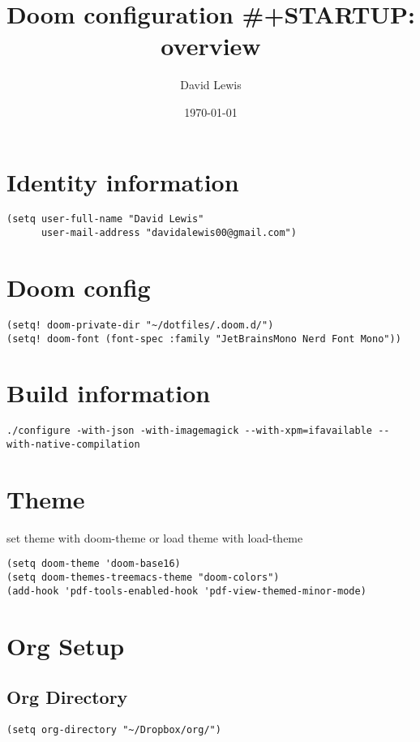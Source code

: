 \documentclass{assignments}
\author{David Lewis}
\date{\today}
\title{Doom configuration \#+STARTUP: overview}
\begin{document}
\maketitle

\section*{Identity information}
\label{sec:orge2912e9}
\begin{verbatim}
(setq user-full-name "David Lewis"
      user-mail-address "davidalewis00@gmail.com")
\end{verbatim}
\section*{Doom config}
\label{sec:orga58354c}
\begin{verbatim}
(setq! doom-private-dir "~/dotfiles/.doom.d/")
(setq! doom-font (font-spec :family "JetBrainsMono Nerd Font Mono"))
\end{verbatim}

\section*{Build information}
\label{sec:org0b87200}
\begin{verbatim}
./configure -with-json -with-imagemagick --with-xpm=ifavailable --with-native-compilation
\end{verbatim}
\section*{Theme}
\label{sec:orgfbf4118}
set theme with doom-theme or load theme with load-theme
\begin{verbatim}
(setq doom-theme 'doom-base16)
(setq doom-themes-treemacs-theme "doom-colors")
(add-hook 'pdf-tools-enabled-hook 'pdf-view-themed-minor-mode)
\end{verbatim}
\section*{Org Setup}
\label{sec:org9e68c63}
\subsection*{Org Directory}
\label{sec:org6a13c51}
\begin{verbatim}
(setq org-directory "~/Dropbox/org/")
\end{verbatim}
\end{document}
